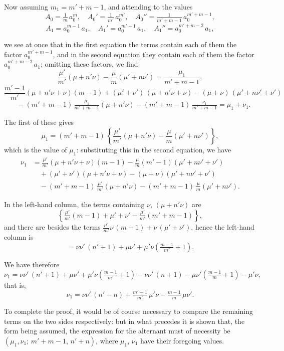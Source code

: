 \documentclass[11pt]{article}
\begin{document}
Now assuming $m_{1}=m'+m-1$, and attending to the values
\[ A_{0} = \tfrac{1}{m}\,a_{0}^{m},\quad A_{0}' = \tfrac{1}{m'}\,a_{0}^{m'},\quad A_{0}'' = \tfrac{1}{m'+m-1}\,a_{0}^{m'+m-1}, \]
\[ A_{1} = a_{0}^{m-1}\,a_{1},\quad A_{1}' = a_{0}^{m'-1}\,a_{1},\quad A_{1}'' = a_{0}^{m'+m-2}\,a_{1}, \]

\bigskip
we see at once that in the first equation the terms contain each of them the factor $a_{0}^{m'+m-1}$, and in the second equation they contain each of them the factor $a_{0}^{m'+m-2}\,a_{1}$; omitting these factors, we find
\[
\frac{\mu'}{m'}(\mu+n'\nu) - \frac{\mu}{m}(\mu'+n\nu') = \frac{\mu_{1}}{m'+m-1},
\]
\[
\frac{m'-1}{m'}(\mu+n'\nu+\nu)(m-1) + (\mu'+\nu')\,(\mu+n'\nu+\nu) - (\mu+\nu)\,(\mu'+n\nu'+\nu')
\]
\[
\quad - (m'+m-1)\,\tfrac{\mu_{1}}{m'+m-1}(\mu+n'\nu) - (m'+m-1)\,\tfrac{\nu_{1}}{m'+m-1} = \mu_{1}+\nu_{1}.
\]

The first of these gives
\[
\mu_{1} = (m'+m-1)\,\left\{\frac{\mu'}{m'}(\mu+n'\nu) - \frac{\mu}{m}(\mu'+n\nu')\right\},
\]
which is the value of $\mu_{1}$: substituting this in the second equation, we have
\begin{align*}
\nu_{1} &= \tfrac{\mu'}{m'}(\mu+n'\nu+\nu)(m-1) - \tfrac{\mu}{m}(m'-1)(\mu'+n\nu'+\nu')\\
        &\quad + (\mu'+\nu')(\mu+n'\nu+\nu) - (\mu+\nu)(\mu'+n\nu'+\nu')\\
        &\quad - (m'+m-1)\,\tfrac{\mu'}{m'}(\mu+n'\nu) - (m'+m-1)\,\tfrac{\mu}{m}(\mu'+n\nu').
\end{align*}

In the left-hand column, the terms containing $\nu$, $(\mu+n'\nu)$ are
\[
\left\{\tfrac{\mu'}{m'}(m-1) + \mu' + \nu' - \tfrac{\mu'}{m'}(m'+m-1)\right\},
\]
and there are besides the terms $\tfrac{\mu'}{m'}\nu\,(m-1) + \nu\,(\mu'+\nu')$, hence the left-hand column is
\[ = \nu\nu'\,(n'+1) + \mu\nu' + \mu'\nu\left(\tfrac{m-1}{m'} + 1\right). \]

We have therefore
\[
\nu_{1} = \nu\nu'\,(n'+1) + \mu\nu' + \mu'\nu\left(\tfrac{m-1}{m'} + 1\right) - \nu\nu'\,(n+1) - \mu\nu'\left(\tfrac{m-1}{m} + 1\right) - \mu'\nu,
\]
that is,
\[
\nu_{1} = \nu\nu'\,(n'-n) + \tfrac{m'-1}{m'}\,\mu'\nu - \tfrac{m-1}{m}\,\mu\nu'.
\]

To complete the proof, it would be of course necessary to compare the remaining terms on the two sides respectively: but in what precedes it is shown that, the form being assumed, the expression for the alternant must of necessity be $(\mu_{1},\nu_{1};\,m'+m-1,\,n'+n)$, where $\mu_{1}$, $\nu_{1}$ have their foregoing values.
\end{document}
